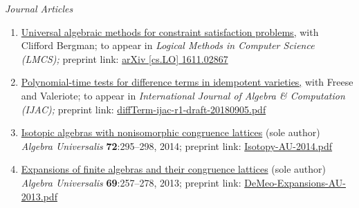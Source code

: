 \newcommand\mmskip{-6mm}

\newcommand\pubitem[6]{\item \href{#5}{#1} #2 \textit{#3} #4 preprint link: \href{#5}{#6}}

    {\it Journal Articles}\\[-6pt]
    \begin{enumerate}
      \pubitem
      {Universal algebraic methods for constraint satisfaction problems,}
      {with Clifford Bergman; to appear in}
      {Logical Methods in Computer Science {\small (LMCS)};}
      {}
      {https://arxiv.org/abs/1611.02867}
      {arXiv [cs.LO] 1611.02867}
        
      \pubitem
      {Polynomial-time tests for difference terms in idempotent varieties,}
      {with Freese and Valeriote; to appear in}
      {International Journal of Algebra \& Computation {\small (IJAC)};}
      {}
      {https://github.com/UniversalAlgebra/term-conditions/blob/master/ijac/diffTerm-ijac-r1-draft-20180905.pdf}
      {diffTerm-ijac-r1-draft-20180905.pdf}
      
      \pubitem 
      {Isotopic algebras with nonisomorphic congruence lattices}
      {(sole author)}  %
      {Algebra Universalis}
      {\textbf{72}:295--298, 2014;} 
      {https://github.com/williamdemeo/Isotopy/blob/master/Isotopy-AU-2014.pdf}
      {Isotopy-AU-2014.pdf}
      
      \pubitem 
      {Expansions of finite algebras and their congruence lattices}
      {(sole author)}
      {Algebra Universalis}
      {\textbf{69}:257--278, 2013;}
      {https://github.com/williamdemeo/Overalgebras/blob/master/DeMeo-Expansions-AU-2013.pdf}
      {DeMeo-Expansions-AU-2013.pdf}

\end{enumerate}



